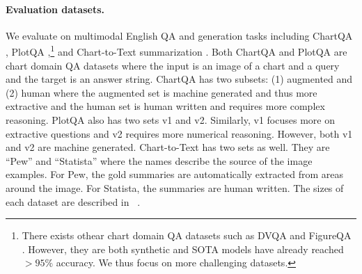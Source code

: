 \begin{table}[t!]
    \small
    \centering
\caption{Statistics of the finetuning datasets.}
    \vspace{-0.5em}
\label{tab:finetune_data}
\end{table}

\paragraph{Evaluation datasets.} We evaluate \model{} on multimodal English QA and generation tasks including ChartQA \citep{masry-etal-2022-chartqa}, PlotQA \citep{methani2020plotqa},\footnote{There exists othear chart domain QA datasets such as DVQA \citep{kafle2018dvqa} and FigureQA \citep{kahou2017figureqa}. However, they are both synthetic and SOTA models have already reached $>95\%$ accuracy. We thus focus on more challenging datasets.} and Chart-to-Text summarization \citep{kantharaj-etal-2022-chart}. Both ChartQA and PlotQA are chart domain QA datasets where the input is an image of a chart and a query and the target is an answer string. ChartQA has two subsets: (1) augmented and (2) human where the augmented set is machine generated and thus more extractive and the human set is human written and requires more complex reasoning. PlotQA also has two sets v1 and v2. Similarly, v1 focuses more on extractive questions and v2 requires more numerical reasoning. However, both v1 and v2 are machine generated. Chart-to-Text has two sets as well. They are ``Pew'' and ``Statista'' where the names describe the source of the image examples. For Pew, the gold summaries are automatically extracted from areas around the image. For Statista, the summaries are human written. The sizes of each dataset are described in
~.




